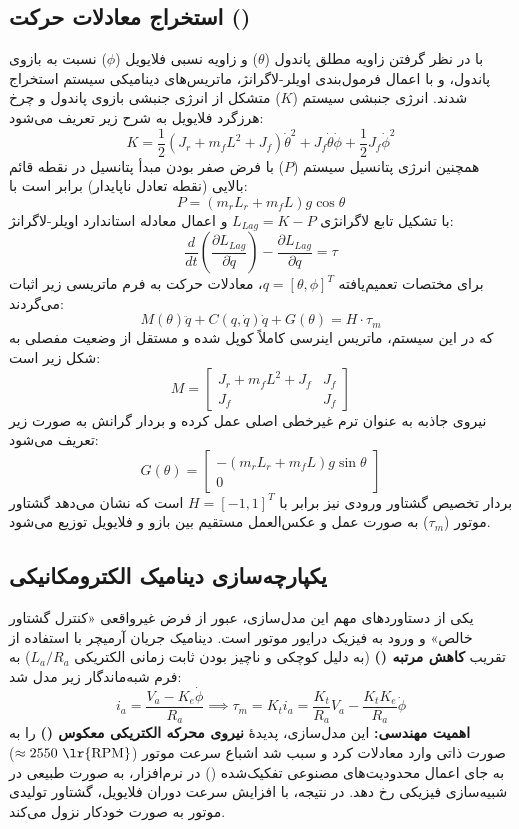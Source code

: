 \documentclass[12pt]{report}
\begin{document}
\subsection{استخراج معادلات حرکت ()}
با در نظر گرفتن زاویه مطلق پاندول ($\theta$) و زاویه نسبی فلایویل ($\phi$) نسبت به بازوی پاندول، و با اعمال فرمول‌بندی اویلر-لاگرانژ، ماتریس‌های دینامیکی سیستم استخراج شدند. انرژی جنبشی سیستم ($K$) متشکل از انرژی جنبشی بازوی پاندول و چرخ هرزگرد فلایویل به شرح زیر تعریف می‌شود:
\[ K = \frac{1}{2} (J_r + m_f L^2 + J_f)\dot{\theta}^2 + J_f \dot{\theta}\dot{\phi} + \frac{1}{2} J_f \dot{\phi}^2 \]
همچنین انرژی پتانسیل سیستم ($P$) با فرض صفر بودن مبدأ پتانسیل در نقطه قائم بالایی (نقطه تعادل ناپایدار) برابر است با:
\[ P = (m_r L_r + m_f L) g \cos\theta \]
با تشکیل تابع لاگرانژی $L_{Lag} = K - P$ و اعمال معادله استاندارد اویلر-لاگرانژ:
\[ \frac{d}{dt} \left( \frac{\partial L_{Lag}}{\partial \dot{q}} \right) - \frac{\partial L_{Lag}}{\partial q} = \tau \]
برای مختصات تعمیم‌یافته $q = [\theta, \phi]^T$، معادلات حرکت به فرم ماتریسی زیر اثبات می‌گردند:
\[ M(\theta) \ddot{q} + C(q, \dot{q}) \dot{q} + G(\theta) = H \cdot \tau_m \]
که در این سیستم، ماتریس اینرسی کاملاً کوپل شده و مستقل از وضعیت مفصلی به شکل زیر است:
\[ M = \begin{bmatrix} J_r + m_f L^2 + J_f & J_f \\ J_f & J_f \end{bmatrix} \]
نیروی جاذبه به عنوان ترم غیرخطی اصلی عمل کرده و بردار گرانش به صورت زیر تعریف می‌شود:
\[ G(\theta) = \begin{bmatrix} -(m_r L_r + m_f L)g \sin\theta \\ 0 \end{bmatrix} \]
بردار تخصیص گشتاور ورودی نیز برابر با $H = [-1, 1]^T$ است که نشان می‌دهد گشتاور موتور ($\tau_m$) به صورت عمل و عکس‌العمل مستقیم بین بازو و فلایویل توزیع می‌شود.

\subsection{یکپارچه‌سازی دینامیک الکترومکانیکی}
یکی از دستاوردهای مهم این مدل‌سازی، عبور از فرض غیرواقعی «کنترل گشتاور خالص» و ورود به فیزیک درایور موتور است. دینامیک جریان آرمیچر با استفاده از تقریب \textbf{کاهش مرتبه ()} (به دلیل کوچکی و ناچیز بودن ثابت زمانی الکتریکی $L_a / R_a$) به فرم شبه‌ماندگار زیر مدل شد:
\[ i_a = \frac{V_a - K_e \dot{\phi}}{R_a} \implies \tau_m = K_t i_a = \frac{K_t}{R_a} V_a - \frac{K_t K_e}{R_a} \dot{\phi} \]
\textbf{اهمیت مهندسی:} این مدل‌سازی، پدیدهٔ \textbf{نیروی محرکه الکتریکی معکوس ()} را به صورت ذاتی وارد معادلات کرد و سبب شد اشباع سرعت موتور ($\approx 2550 \text{ \lr{RPM}}$) به جای اعمال محدودیت‌های مصنوعی تفکیک‌شده () در نرم‌افزار، به صورت طبیعی در شبیه‌سازی فیزیکی رخ دهد. در نتیجه، با افزایش سرعت دوران فلایویل، گشتاور تولیدی موتور به صورت خودکار نزول می‌کند.
\end{document}
